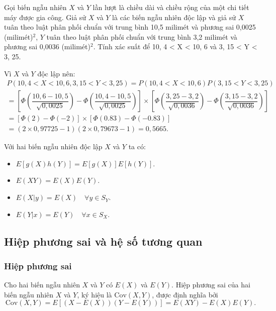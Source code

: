 \documentclass[12pt,a4paper]{article}
\begin{document}
\begin{vidu}
Gọi biến ngẫu nhiên $X$ và $Y$ lần lượt là chiều dài và chiều rộng của một chi tiết máy được gia công. Giả sử $X$ và $Y$ là các biến ngẫu nhiên độc lập và giả sử $X$ tuân theo luật phân phối chuẩn với trung bình 10,5 milimét và phương sai 0,0025 (milimét)$^2$, $Y$ tuân theo luật phân phối chuẩn với trung bình 3,2 milimét và phương sai 0,0036 (milimét)$^2$. Tính xác suất để 10, 4 < X < 10, 6 và 3, 15 < Y < 3, 25.

Vì $X$ và $Y$ độc lập nên:
\begin{align*}
  P(10, 4 < X < 10, 6, 3, 15 < Y < 3, 25) = P(10, 4 < X < 10, 6)P(3, 15 < Y < 3, 25)
  \\= [\Phi\left(\dfrac{10, 6 - 10, 5}{\sqrt{0, 0025}}\right) - \Phi\left(\dfrac{10, 4 - 10, 5}{\sqrt{0, 0025}}\right)]
  \times [\Phi\left(\dfrac{3, 25 - 3, 2}{\sqrt{0, 0036}}\right) - \Phi\left(\dfrac{3, 15 - 3, 2}{\sqrt{0, 0036}}\right)]
  \\= [\Phi(2) - \Phi(-2)] \times [\Phi(0.83) - \Phi(-0.83)]
  \\= (2 \times 0, 97725 - 1)(2 \times 0, 79673 - 1)
  = 0, 5665.
\end{align*}
\end{vidu}

\begin{tinhchat}
Với hai biến ngẫu nhiên độc lập $X$ và $Y$ ta có:
\begin{itemize}
  \item $E[g(X)h(Y )] = E[g(X)]E[h(Y )]$.
  \item $E(XY ) = E(X)E(Y )$.
  \item $E(X|y) = E(X) \quad \forall y \in S_Y$.
  \item $E(Y |x) = E(Y ) \quad \forall x \in S_X$.
\end{itemize}
\end{tinhchat}

\subsection{Hiệp phương sai và hệ số tương quan}

\subsubsection{Hiệp phương sai}

\begin{dinhnghia}
Cho hai biến ngẫu nhiên $X$ và $Y$ có $E(X)$ và $E(Y)$. Hiệp phương sai của hai biến ngẫu nhiên $X$ và $Y$, ký hiệu là $\mathrm{Cov}(X, Y)$, được định nghĩa bởi
\[
  \mathrm{Cov}(X, Y) = E\left[(X - E(X))(Y - E(Y))\right] = E(XY) - E(X)E(Y).
\]
\end{dinhnghia}
\end{document}
